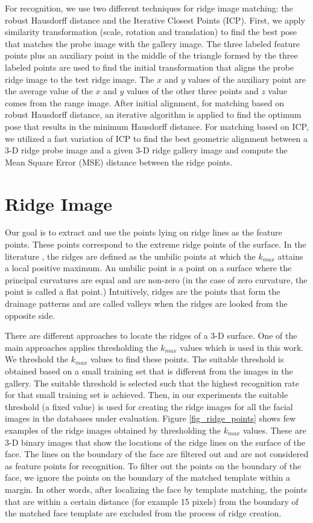 For recognition, we use two different techniques for ridge image
matching: the robust Hausdorff distance and the Iterative Closest
Points (ICP). First, we apply similarity transformation (scale,
rotation and translation) to find the best pose that matches the
probe image with the gallery image. The three labeled feature points
plus an auxiliary point in the middle of the triangle formed by the
three labeled points are used to find the initial transformation
that aligns the probe ridge image to the test ridge image. The $x$
and $y$ values of the auxiliary point are the average value of the
$x$ and $y$ values of the other three points and $z$ value comes
from the range image. After initial alignment, for matching based on
robust Hausdorff distance, an iterative algorithm is applied to find
the optimum pose that results in the minimum Hausdorff distance. For
matching based on ICP, we utilized a fast variation of ICP to find
the best geometric alignment between a 3-D ridge probe image and a
given 3-D ridge gallery image and compute the Mean Square Error
(MSE) distance between the ridge points.

\section{Ridge Image} Our goal is to extract and use the points
lying on ridge lines as the feature points. These points correspond
to the extreme ridge points of the surface. In the literature
\cite{Anoshkina94}, the ridges are defined as the umbilic points at
which the $k_{max}$ attains a local positive maximum. An umbilic
point is a point on a surface where the principal curvatures are
equal and are non-zero (in the case of zero curvature, the point is
called a flat point.) Intuitively, ridges are the points that form
the drainage patterns and are called valleys when the ridges are
looked from the opposite side.

There are different approaches to locate the ridges \cite{Lopez99}
of a 3-D surface. One of the main approaches applies thresholding
the $k_{max}$ values which is used in this work. We threshold the
$k_{max}$ values to find these points. The suitable threshold is
obtained based on a small training set that is different from the
images in the gallery. The suitable threshold is selected such that
the highest recognition rate for that small training set is
achieved. Then, in our experiments the suitable threshold (a fixed
value) is used for creating the ridge images for all the facial
images in the databases under evaluation. Figure
\ref{fig_ridge_points} shows few examples of the ridge images
obtained by thresholding the $k_{max}$ values. These are 3-D binary
images that show the locations of the ridge lines on the surface of
the face. The lines on the boundary of the face are filtered out and
are not considered as feature points for recognition. To filter out
the points on the boundary of the face, we ignore the points on the
boundary of the matched template within a margin. In other words,
after localizing the face by template matching, the points that are
within a certain distance (for example 15 pixels) from the boundary
of the matched face template are excluded from the process of ridge
creation.

